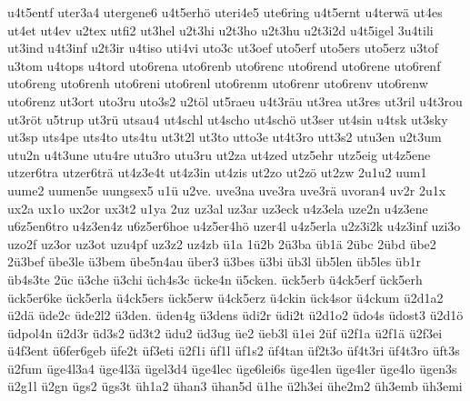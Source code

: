 {    u4t5entf
    uter3a4
    utergene6
    u4t5erhö
    uteri4e5
    ute6ring
    u4t5ernt
    u4terwä
    ut4es
    ut4et
    ut4ev
    u2tex
    utfi2
    ut3hel
    u2t3hi
    u2t3ho
    u2t3hu
    u2t3i2d
    u4t5igel
    3u4tili
    ut3ind
    u4t3inf
    u2t3ir
    u4tiso
    uti4vi
    uto3c
    ut3oef
    uto5erf
    uto5ers
    uto5erz
    u3tof
    u3tom
    u4tops
    u4tord
    uto6rena
    uto6renb
    uto6renc
    uto6rend
    uto6rene
    uto6renf
    uto6reng
    uto6renh
    uto6reni
    uto6renl
    uto6renm
    uto6renr
    uto6renv
    uto6renw
    uto6renz
    ut3ort
    uto3ru
    uto3s2
    u2töl
    ut5raeu
    u4t3räu
    ut3rea
    ut3res
    ut3ril
    u4t3rou
    ut3röt
    u5trup
    ut3rü
    utsau4
    ut4schl
    ut4scho
    ut4schö
    ut3ser
    ut4sin
    u4tsk
    ut3sky
    ut3sp
    uts4pe
    uts4to
    uts4tu
    ut3t2l
    ut3to
    utto3e
    ut4t3ro
    utt3s2
    utu3en
    u2t3um
    utu2n
    u4t3une
    utu4re
    utu3ro
    utu3ru
    ut2za
    ut4zed
    utz5ehr
    utz5eig
    ut4z5ene
    utzer6tra
    utzer6trä
    ut4z3e4t
    ut4z3in
    ut4zis
    ut2zo
    ut2zö
    ut2zw
    2u1u2
    uum1
    uume2
    uumen5e
    uungsex5
    u1ü
    u2ve.
    uve3na
    uve3ra
    uve3rä
    uvoran4
    uv2r
    2u1x
    ux2a
    ux1o
    ux2or
    ux3t2
    u1ya
    2uz
    uz3al
    uz3ar
    uz3eck
    u4z3ela
    uze2n
    u4z3ene
    u6z5en6tro
    u4z3en4z
    u6z5er6hoe
    u4z5er4hö
    uzer4l
    u4z5erla
    u2z3i2k
    u4z3inf
    uzi3o
    uzo2f
    uz3or
    uz3ot
    uzu4pf
    uz3z2
    uz4zb
    ü1a
    1ü2b
    2ü3ba
    üb1ä
    2übc
    2übd
    übe2
    2ü3bef
    übe3le
    ü3bem
    übe5n4au
    über3
    ü3bes
    ü3bi
    üb3l
    üb5len
    üb5les
    üb1r
    üb4s3te
    2üc
    ü3che
    ü3chi
    üch4s3c
    ücke4n
    ü5cken.
    ück5erb
    ü4ck5erf
    ück5erh
    ück5er6ke
    ück5erla
    ü4ck5ers
    ück5erw
    ü4ck5erz
    ü4ckin
    ück4sor
    ü4ckum
    ü2d1a2
    ü2dä
    üde2c
    üde2l2
    ü3den.
    üden4g
    ü3dens
    üdi2r
    üdi2t
    ü2d1o2
    üdo4s
    üdost3
    ü2d1ö
    üdpol4n
    ü2d3r
    üd3s2
    üd3t2
    üdu2
    üd3ug
    üe2
    üeb3l
    ü1ei
    2üf
    ü2f1a
    ü2f1ä
    ü2f3ei
    ü4f3ent
    ü6fer6geb
    üfe2t
    üf3eti
    ü2f1i
    üf1l
    üf1s2
    üf4tan
    üf2t3o
    üf4t3ri
    üf4t3ro
    üft3s
    ü2fum
    üge4l3a4
    üge4l3ä
    ügel3d4
    üge4lec
    üge6lei6s
    üge4len
    üge4ler
    üge4lo
    ügen3s
    ü2g1l
    ü2gn
    ügs2
    ügs3t
    üh1a2
    ühan3
    ühan5d
    ü1he
    ü2h3ei
    ühe2m2
    üh3emb
    üh3emi
}
